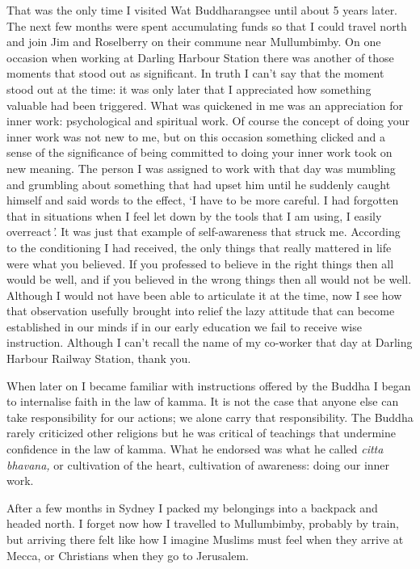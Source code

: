 That was the only time I visited Wat Buddharangsee until about 5 years
later. The next few months were spent accumulating funds so that I could
travel north and join Jim and Roselberry on their commune near
Mullumbimby. On one occasion when working at Darling Harbour Station
there was another of those moments that stood out as significant. In
truth I can't say that the moment stood out at the time: it was only
later that I appreciated how something valuable had been triggered. What
was quickened in me was an appreciation for inner work: psychological
and spiritual work. Of course the concept of doing your inner work was
not new to me, but on this occasion something clicked and a sense of the
significance of being committed to doing your inner work took on new
meaning. The person I was assigned to work with that day was mumbling
and grumbling about something that had upset him until he suddenly
caught himself and said words to the effect, `I have to be more careful.
I had forgotten that in situations when I feel let down by the tools
that I am using, I easily overreact\emph{'.} It was just that example of
self-awareness that struck me. According to the conditioning I had
received, the only things that really mattered in life were what you
believed. If you professed to believe in the right things then all would
be well, and if you believed in the wrong things then all would not be
well. Although I would not have been able to articulate it at the time,
now I see how that observation usefully brought into relief the lazy
attitude that can become established in our minds if in our early
education we fail to receive wise instruction. Although I can't recall
the name of my co-worker that day at Darling Harbour Railway Station,
thank you.

When later on I became familiar with instructions offered by the Buddha
I began to internalise faith in the law of kamma. It is not the case
that anyone else can take responsibility for our actions; we alone carry
that responsibility. The Buddha rarely criticized other religions but he
was critical of teachings that undermine confidence in the law of kamma.
What he endorsed was what he called \emph{citta bhavana,} or cultivation
of the heart, cultivation of awareness: doing our inner work.

After a few months in Sydney I packed my belongings into a backpack and
headed north. I forget now how I travelled to Mullumbimby, probably by
train, but arriving there felt like how I imagine Muslims must feel when
they arrive at Mecca, or Christians when they go to Jerusalem.

